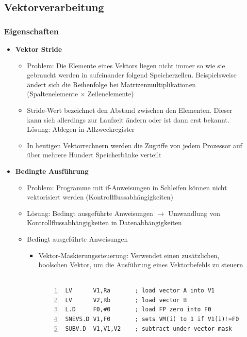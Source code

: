\subsection{Vektorverarbeitung}

\subsubsection{Eigenschaften}
\begin{itemize}
	\item \textbf{Vektor Stride}
	\begin{itemize}
		\item Problem: Die Elemente eines Vektors liegen nicht immer so wie sie gebraucht werden in aufeinander folgend Speicherzellen. Beispielsweise ändert sich die Reihenfolge bei Matrizenmultiplikationen (Spaltenelemente \(\times\) Zeilenelemente)
		\item Stride-Wert bezeichnet den Abstand zwischen den Elementen. Dieser kann sich allerdings zur Laufzeit ändern oder ist dann erst bekannt. Lösung: Ablegen in Allzweckregister
		\item In heutigen Vektorrechnern werden die Zugriffe von jedem Prozessor auf über mehrere Hundert Speicherbänke verteilt 
	\end{itemize}
	\item \textbf{Bedingte Ausführung}
	\begin{itemize}
		\item Problem: Programme mit if-Anweisungen in Schleifen können nicht vektorisiert werden (Kontrollflussabhängigkeiten)
		\item Lösung: Bedingt ausgeführte Anweisungen \(\rightarrow\) Umwandlung von Kontrollflussabhängigkeiten in Datenabhängigkeiten
		\item Bedingt ausgeführte Anweisungen
		\begin{itemize}
			\item Vektor-Maskierungssteuerung: Verwendet einen zusätzlichen, boolschen Vektor, um die Ausführung eines Vektorbefehls zu steuern\\\\
				\begin{minipage}{\linewidth}
				\begin{lstlisting}[frame=single,numbers=left,mathescape,language={[mips]Assembler},tabsize=4]
LV 		V1,Ra       ; load vector A into V1
LV 		V2,Rb       ; load vector B
L.D 	F0,#0       ; load FP zero into F0
SNEVS.D V1,F0    	; sets VM(i) to 1 if V1(i)!=F0
SUBV.D 	V1,V1,V2  	; subtract under vector mask

\end{lstlisting}
\end{minipage}
\end{itemize}
\end{itemize}
\end{itemize}

